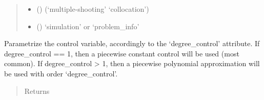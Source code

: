 \documentclass[letterpaper,10pt,english]{sphinxmanual}
\begin{document}
\begin{fulllineitems}
\begin{fulllineitems}
\begin{quote}
\begin{description}
\begin{itemize}
\item {} 
 () \textendash{} (‘multiple-shooting’ \textbar{} ‘collocation’)

\item {} 
 () \textendash{} ‘simulation’ or ‘problem\_info’

\end{itemize}

\end{description}\end{quote}

\end{fulllineitems}


\begin{fulllineitems}
\label{\detokenize{yaocptool.methods.base:yaocptool.methods.base.solutionmethodsbase.SolutionMethodsBase.call_solver}}
\end{fulllineitems}


\begin{fulllineitems}
\label{\detokenize{yaocptool.methods.base:yaocptool.methods.base.solutionmethodsbase.SolutionMethodsBase.collocation_points}}
\end{fulllineitems}


\begin{fulllineitems}
\label{\detokenize{yaocptool.methods.base:yaocptool.methods.base.solutionmethodsbase.SolutionMethodsBase.create_control_approximation}}
Parametrize the control variable, accordingly to the ‘degree\_control’ attribute.
If degree\_control == 1, then a piecewise constant control will be used (most common).
If degree\_control \textgreater{} 1, then a piecewise polynomial approximation will be used with order ‘degree\_control’.
\begin{quote}\begin{description}
\item[{Returns}] \leavevmode



\end{description}
\end{quote}
\end{fulllineitems}
\end{fulllineitems}
\end{document}
